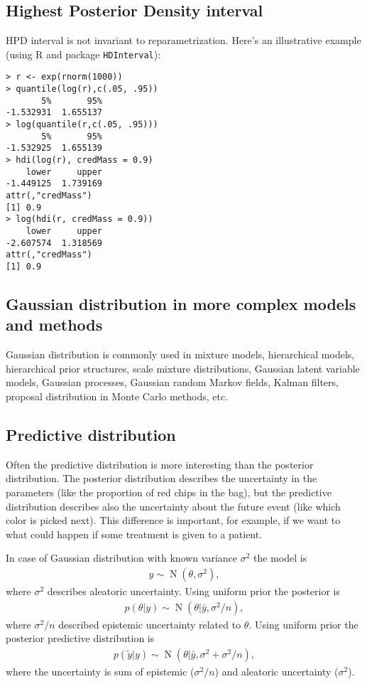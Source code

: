 \documentclass[a4paper,11pt,english]{article}
\DeclareMathOperator{\N}{N}
\begin{document}
\subsection*{Highest Posterior Density interval}

HPD interval is not invariant to reparametrization. Here's an illustrative
example (using R and package {\tt HDInterval}):
 {\small
\begin{verbatim}
> r <- exp(rnorm(1000))
> quantile(log(r),c(.05, .95))
       5%       95% 
-1.532931  1.655137 
> log(quantile(r,c(.05, .95)))
       5%       95% 
-1.532925  1.655139 
> hdi(log(r), credMass = 0.9)
    lower     upper 
-1.449125  1.739169 
attr(,"credMass")
[1] 0.9
> log(hdi(r, credMass = 0.9))
    lower     upper 
-2.607574  1.318569 
attr(,"credMass")
[1] 0.9
\end{verbatim}
}

\subsection*{Gaussian distribution in more complex models and methods}

Gaussian distribution is commonly used in mixture models, hierarchical
models, hierarchical prior structures, scale mixture distributions,
Gaussian latent variable models, Gaussian processes, Gaussian random
Markov fields, Kalman filters, proposal distribution in Monte Carlo
methods, etc.

\subsection*{Predictive distribution}

Often the predictive distribution is more interesting than the
posterior distribution. The posterior distribution describes the
uncertainty in the parameters (like the proportion of red chips in the
bag), but the predictive distribution describes also the uncertainty
about the future event (like which color is picked next). This
difference is important, for example, if we want to what could happen
if some treatment is given to a patient.

In case of Gaussian distribution with known variance $\sigma^2$ the model is
\begin{align*}
  y\sim \N(\theta,\sigma^2),
\end{align*}
where $\sigma^2$ describes aleatoric uncertainty.
Using uniform prior the posterior is 
\begin{align*}
  p(\theta|y) \sim \N(\theta|\bar{y},\sigma^2/n),
\end{align*}
where $\sigma^2/n$ described epistemic uncertainty related to $\theta$.
Using uniform prior the posterior predictive distribution is 
\begin{align*}
  p(\tilde{y}|y) \sim \N(\theta|\bar{y},\sigma^2+\sigma^2/n),
\end{align*}
where the uncertainty is sum of epistemic ($\sigma^2/n$) and aleatoric
uncertainty ($\sigma^2$).
\end{document}
